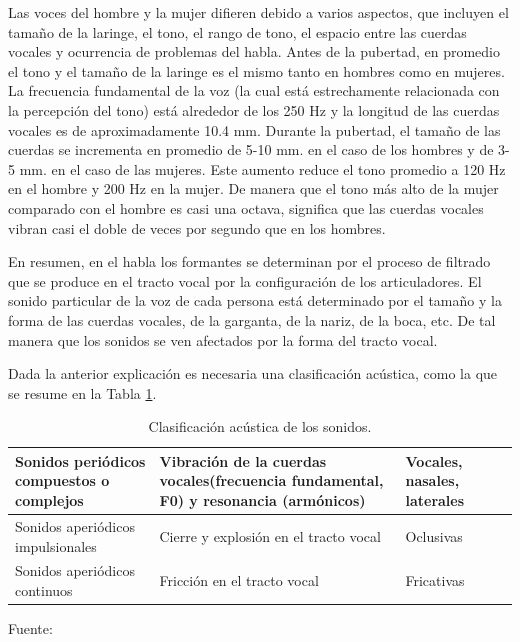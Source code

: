 \begin{enumerate}
\par
Las voces del hombre y la mujer difieren debido a varios aspectos, que incluyen el tamaño de la laringe, el tono, el rango de tono, el espacio entre las cuerdas vocales y ocurrencia de problemas del habla. Antes de la pubertad, en promedio el tono y el tamaño de la laringe es el mismo tanto en hombres como en mujeres. La frecuencia fundamental de la voz (la cual está estrechamente relacionada con la percepción del tono) está alrededor de los 250 Hz y la longitud de las cuerdas vocales es de aproximadamente 10.4 mm. 
\vskip 0.5cm
Durante la pubertad, el tamaño de las cuerdas se incrementa en promedio de 5-10 mm. en el caso de los hombres y de 3-5 mm. en el caso de las mujeres. Este aumento reduce el tono promedio a 120 Hz en el hombre y 200 Hz en la mujer. De manera que el tono más alto de la mujer comparado con el hombre es casi una octava, significa que las cuerdas vocales vibran casi el doble de veces por segundo que en los hombres.

\vskip 0.5cm
En resumen, en el habla los formantes se determinan por el proceso de filtrado que se produce en el tracto vocal por la configuración de los articuladores. El sonido particular de la voz de cada persona está determinado por el tamaño y la forma de las cuerdas vocales, de la garganta, de la nariz, de la boca, etc. De tal manera que los sonidos se ven afectados por la forma del tracto vocal.

\vskip 0.5cm
Dada la anterior explicación es necesaria una clasificación acústica, como la que se resume en la Tabla \ref{table:tabla2.1}.

\begin{center}
\begin{table}[h!]
\centering
\caption{\small{Clasificación acústica de los sonidos.}}
\label{table:tabla2.1}
\vskip 0.2cm
\begin{tabular}{|p{4cm}|p{8cm}|p{3cm}|r|}
\hline
{\small Sonidos periódicos compuestos o complejos} & {\small Vibración de la cuerdas vocales(frecuencia fundamental, F0) y resonancia (armónicos)} & {\small Vocales, nasales, laterales}  \\ 
\hline 
{\small Sonidos aperiódicos impulsionales} & {\small Cierre y explosión en el tracto vocal} & {\small Oclusivas}  \\ 
\hline 
{\small Sonidos aperiódicos continuos} & {\small Fricción en el tracto vocal} & {\small Fricativas}  \\ 
\hline 
\end{tabular} 
\begin{center}
\vskip 0.2cm
{\small{Fuente: \cite{joaquim}}}
\end{center}
\end{table}
\end{center}


\end{enumerate}
